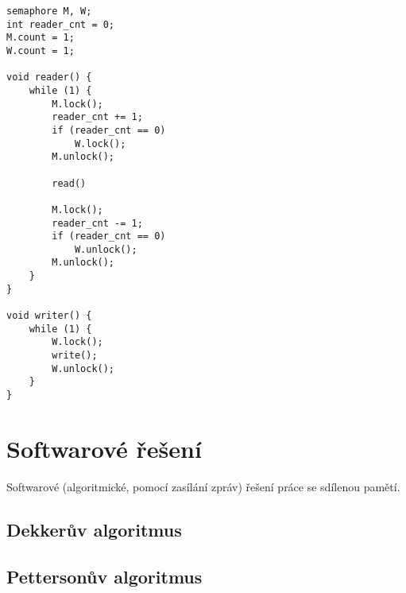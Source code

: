\noindent\begin{minipage}{\linewidth}
\begin{lstlisting}[language=c_language, caption={Implementace problému čtenářů a písařů s využitím semaforů.}]
semaphore M, W;
int reader_cnt = 0;
M.count = 1;
W.count = 1;

void reader() {
    while (1) {
        M.lock();
        reader_cnt += 1;
        if (reader_cnt == 0)
            W.lock();
        M.unlock();

        read()

        M.lock();
        reader_cnt -= 1;
        if (reader_cnt == 0)
            W.unlock();
        M.unlock();
    }
}

void writer() {
    while (1) {
        W.lock();
        write();
        W.unlock();
    }
}
\end{lstlisting}
\end{minipage}


\section{Softwarové řešení}

\begin{compactitem}
    \item Softwarové (algoritmické, pomocí zasílání zpráv) řešení práce se sdílenou pamětí.
\end{compactitem}

\subsection{Dekkerův algoritmus}

\begin{compactitem}
    \item {}
\end{compactitem}

\subsection{Pettersonův algoritmus}

\begin{compactitem}
    \item {}
\end{compactitem}



